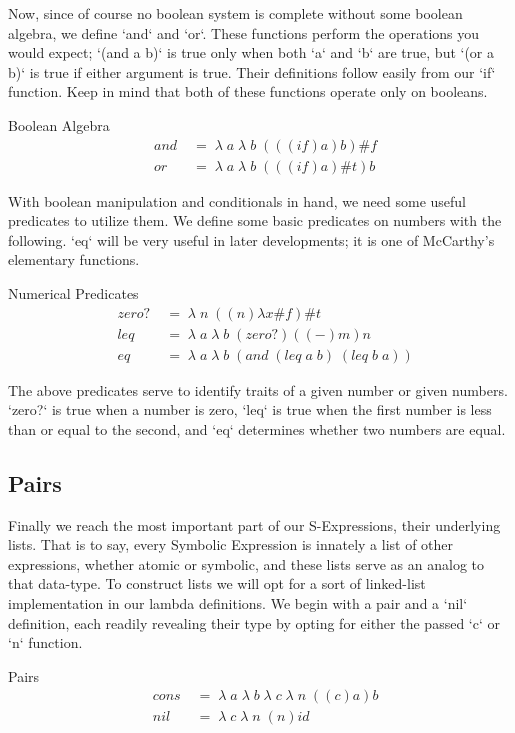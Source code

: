 Now, since of course no boolean system is complete without some boolean algebra, 
we define `and` and `or`. These functions perform the operations you would expect; 
`(and a b)` is true only when both `a` and `b` are true, but `(or a b)` is true if 
either argument is true. Their definitions follow easily from our `if` function. 
Keep in mind that both of these functions operate only on booleans.

Boolean Algebra
\begin{align*}
& and \; &= \; \lambda \; a \; \lambda \; b \; (((if)a)b)\#f
\\& or \; &= \; \lambda \; a \; \lambda \; b \; (((if)a)\#t)b
\end{align*}

With boolean manipulation and conditionals in hand, we need some useful predicates 
to utilize them. We define some basic predicates on numbers with the following. 
`eq` will be very useful in later developments; it is one of McCarthy's elementary 
functions.

Numerical Predicates
\begin{align*}
& zero? \; &= \; \lambda \; n \; ((n)λx\#f)\#t
\\& leq \; &= \; \lambda \; a \; \lambda \; b \; (zero?)((-)m)n
\\& eq \; &= \; \lambda \; a \; \lambda \; b \; (and \; (leq \; a \; b) \; (leq \; b \; a))
\end{align*}

The above predicates serve to identify traits of a given number or given numbers. 
`zero?` is true when a number is zero, `leq` is true when the first number is less 
than or equal to the second, and `eq` determines whether two numbers are equal.

\subsection{Pairs}
Finally we reach the most important part of our S-Expressions, their underlying 
lists. That is to say, every Symbolic Expression is innately a list of other 
expressions, whether atomic or symbolic, and these lists serve as an analog to 
that data-type. To construct lists we will opt for a sort of linked-list 
implementation in our lambda definitions. We begin with a pair and a `nil` 
definition, each readily revealing their type by opting for either the passed `c` 
or `n` function.

Pairs
\begin{align*}
& cons \; &= \; \lambda \; a \; \lambda \; b \; \lambda \; c \; \lambda \; n \; ((c)a)b
\\& nil \; &= \; \lambda \; c \; \lambda \; n \; (n)id
\end{align*}


